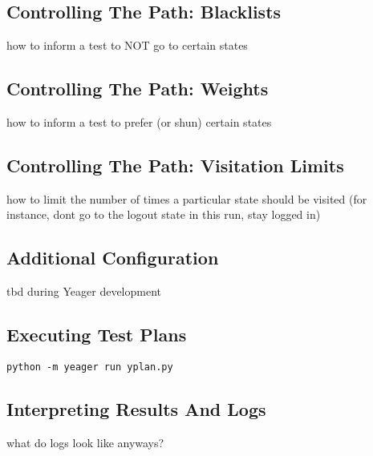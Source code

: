 \subsection{Controlling The Path: Blacklists}
how to inform a test to NOT go to certain states

\subsection{Controlling The Path: Weights}
how to inform a test to prefer (or shun) certain states

\subsection{Controlling The Path: Visitation Limits}
how to limit the number of times a particular state should be visited (for instance, dont go to the logout state in this run, stay logged in)

\subsection{Additional Configuration}
tbd during Yeager development

\subsection{Executing Test Plans}
\texttt{python -m yeager run yplan.py}

\subsection{Interpreting Results And Logs}
what do logs look like anyways?
